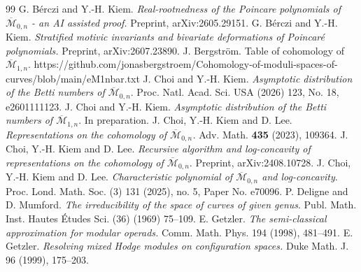 \documentclass[11pt]{amsart}
\numberwithin{equation}{section}
\theoremstyle{definition}
\def\cM{{\mathcal M}}
\def\bcM{\overline{\cM}}
\begin{document}
\bigskip


\begin{thebibliography}{99}
     G. B\'erczi and Y.-H. Kiem. {\em Real-rootnedness of the Poincare polynomials of $\overline{\mathcal{M}}_{0,n}$ - an AI assisted proof.} Preprint, arXiv:2605.29151.
     G. B\'erczi and Y.-H. Kiem. {\em Stratified motivic invariants and bivariate deformations of Poincar\'e polynomials.} Preprint, arXiv:2607.23890.
     J. Bergstr\"om. Table of cohomology of $\bcM_{1,n}$.  https://github.com/jonasbergstroem/Cohomology-of-moduli-spaces-of-curves/blob/main/eM1nbar.txt
     J. Choi and Y.-H. Kiem. {\em Asymptotic distribution of the Betti numbers of $\bcM_{0,n}$}. Proc. Natl. Acad. Sci. USA (2026) 123, No. 18, e2601111123.
     J. Choi and Y.-H. Kiem. {\em Asymptotic distribution of the Betti numbers of $\bcM_{1,n}$}. In preparation. 
     J. Choi, Y.-H. Kiem and D. Lee. {\em Representations on the cohomology of $\overline{\mathcal{M}}_{0,n}$.} Adv. Math. \textbf{435} (2023), 109364.
     J. Choi, Y.-H. Kiem and D. Lee. {\em Recursive algorithm and log-concavity of representations on the cohomology of $\bcM_{0,n}$}. Preprint, arXiv:2408.10728.
     J. Choi, Y.-H. Kiem and D. Lee. {\em Characteristic polynomial of $\bcM_{0,n}$ and log-concavity}. Proc. Lond. Math. Soc. (3) 131 (2025), no. 5, Paper No. e70096.
     P. Deligne and D. Mumford. {\em The irreducibility of the space of curves of given genus}. Publ. Math. Inst. Hautes Études Sci. (36) (1969) 75–109.
     E. Getzler. {\em The semi-classical approximation for modular operads.} Comm. Math. Phys. 194 (1998), 481--491.
     E. Getzler. {\em Resolving mixed Hodge modules on configuration spaces.} Duke Math. J. 96 (1999), 175--203.

\end{thebibliography}
\end{document}
